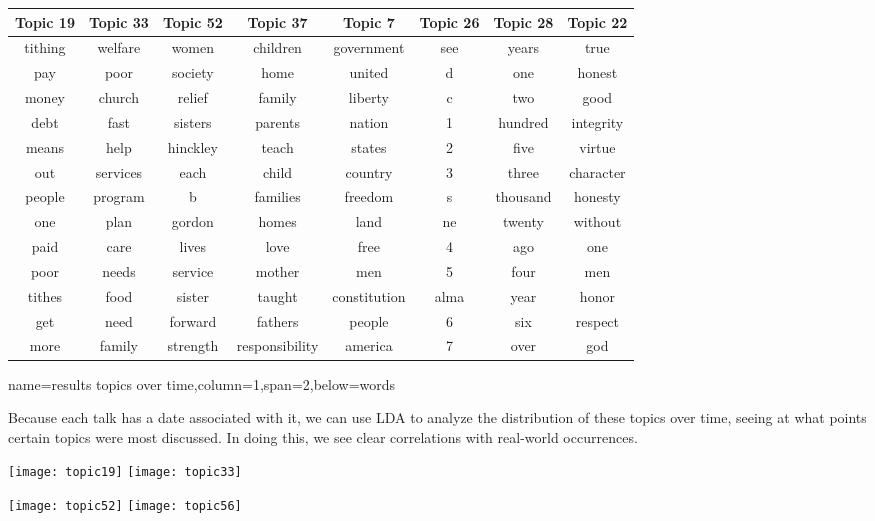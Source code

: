 \documentclass[landscape,final]{baposter}
\begin{document}
\begin{poster}
{	\begin{center}
	  \begin{tabular}{cccccccc}
		Topic 19&Topic 33&Topic 52&Topic 37&Topic 7&Topic 26&Topic 28&Topic 22\\
		\hline
		tithing&welfare&women&children&government&see&years&true \\
		pay&poor&society&home&united&d&one&honest \\
		money&church&relief&family&liberty&c&two&good \\
		debt&fast&sisters&parents&nation&1&hundred&integrity \\
		means&help&hinckley&teach&states&2&five&virtue \\
		out&services&each&child&country&3&three&character \\
		people&program&b&families&freedom&s&thousand&honesty \\
		one&plan&gordon&homes&land&ne&twenty&without \\
		paid&care&lives&love&free&4&ago&one \\
		poor&needs&service&mother&men&5&four&men \\
		tithes&food&sister&taught&constitution&alma&year&honor \\
		get&need&forward&fathers&people&6&six&respect \\
		more&family&strength&responsibility&america&7&over&god \\
	  \end{tabular}
	\end{center}

  }

  {name=results topics over time,column=1,span=2,below=words}{

	Because each talk has a date associated with it, we can use LDA to analyze
	the distribution of these topics over time, seeing at what points certain
	topics were most discussed.  In doing this, we see clear correlations with
	real-world occurrences.

	\begin{center}
	  \texttt{[image: topic19]}
	  \texttt{[image: topic33]}

	  \texttt{[image: topic52]}
	  \texttt{[image: topic56]}
	\end{center}

  }


\end{poster}
\end{document}
